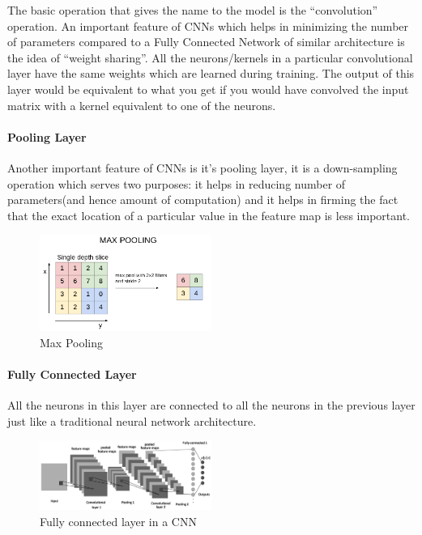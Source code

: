 \documentclass[conference]{IEEEtran}
\begin{document}
The basic operation that gives the name to the model is the “convolution” operation. An important feature of CNNs which helps in minimizing the number of parameters compared to a Fully Connected Network of similar architecture is the idea of “weight sharing”. All the neurons/kernels in a particular convolutional layer have the same weights which are learned during training. The output of this layer would be equivalent to what you get if you would have convolved the input matrix with a kernel equivalent to one of the neurons. 

\paragraph{Pooling Layer\\}
Another important feature of CNNs is it’s pooling layer, it is a down-sampling operation which serves two purposes: it helps in reducing number of parameters(and hence amount of computation) and it helps in firming the fact that the exact location of a particular value in the feature map is less important. 

\begin{figure}[htbp]
\centerline{\includegraphics[width=0.5\textwidth]{pics/image_theory/max_pool.png}}
\caption{ Max Pooling}
\label{fig:pooling}
\end{figure}%


\paragraph{Fully Connected Layer\\}

All the neurons in this layer are connected to all the neurons in the previous layer just like a traditional neural network architecture.
\begin{figure}[htbp]
\centerline{\includegraphics[width=0.5\textwidth]{pics/image_theory/cnn.png}}
\caption{ Fully connected layer in a CNN}
\label{fig:cnn}
\end{figure}%
\end{document}
